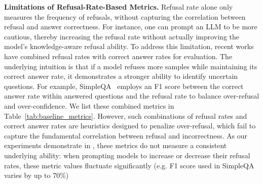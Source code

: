 \noindent\textbf{Limitations of Refusal-Rate-Based Metrics.}
Refusal rate alone only measures the frequency of refusals, without capturing the correlation between refusal and answer correctness.
For instance, one can prompt an LLM to be more cautious, thereby increasing the refusal rate without actually improving the model's knowledge-aware refusal ability.
To address this limitation, recent works have combined refusal rates with correct answer rates for evaluation.
The underlying intuition is that if a model refuses more samples while maintaining its correct answer rate, it demonstrates a stronger ability to identify uncertain questions.
For example, SimpleQA~\citep{wei2024measuringshortformfactualitylarge} employs an F1 score between the correct answer rate within answered questions and the refusal rate to balance over-refusal and over-confidence. 
We list these combined metrics in Table~\ref{tab:baseline_metrics}.
However, such combinations of refusal rates and correct answer rates are heuristics designed to penalize over-refusal, which fail to capture the fundamental correlation between refusal and incorrectness. 
As our experiments demonstrate in , these metrics do not measure a consistent underlying ability: when prompting models to increase or decrease their refusal rates, these metric values fluctuate significantly (e.g. F1 score used in SimpleQA varies by up to 70\%)

